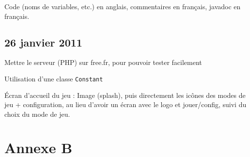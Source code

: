 \documentclass[a4paper,11pt,french]{article}
\begin{document}
Code (noms de variables, etc.) en anglais, commentaires en français, javadoc en français.

\subsection{26 janvier 2011}
Mettre le serveur (PHP) sur free.fr, pour pouvoir tester facilement

Utilisation d'une classe \verb!Constant!

Écran d'accueil du jeu : Image (splash), puis directement les icônes des modes de jeu + configuration, au lieu d'avoir un écran avec le logo et jouer/config, suivi du choix du mode de jeu.

\section{Annexe B}
\end{document}
